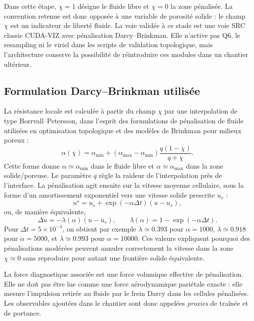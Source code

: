 \documentclass[11pt,a4paper]{article}
\begin{document}
Dans cette étape, $\chi=1$ désigne le fluide libre et $\chi=0$ la zone pénalisée. La convention retenue est donc opposée à une variable de porosité solide : le champ $\chi$ est un indicateur de liberté fluide. La voie validée à ce stade est une voie SRC classic CUDA-VIZ avec pénalisation Darcy--Brinkman. Elle n'active pas Q6, le resampling ni le viriel dans les scripts de validation topologique, mais l'architecture conserve la possibilité de réintroduire ces modules dans un chantier ultérieur.

\subsection{Formulation Darcy--Brinkman utilisée}

La résistance locale est calculée à partir du champ $\chi$ par une interpolation de type Borrvall--Petersson, dans l'esprit des formulations de pénalisation de fluide utilisées en optimisation topologique et des modèles de Brinkman pour milieux poreux \cite{Brinkman1949,BorrvallPetersson2003} :
\begin{equation}
  \alpha(\chi)=\alpha_{\min}+\left(\alpha_{\max}-\alpha_{\min}\right)\frac{q(1-\chi)}{q+\chi}.
\end{equation}
Cette forme donne $\alpha\simeq \alpha_{\min}$ dans le fluide libre et $\alpha\simeq \alpha_{\max}$ dans la zone solide/poreuse. Le paramètre $q$ règle la raideur de l'interpolation près de l'interface. La pénalisation agit ensuite sur la vitesse moyenne cellulaire, sous la forme d'un amortissement exponentiel vers une vitesse solide prescrite $u_s$ :
\begin{equation}
  u^{\star}=u_s+\exp(-\alpha\Delta t)(u-u_s),
\end{equation}
ou, de manière équivalente,
\begin{equation}
  \Delta u=-\lambda(\alpha)(u-u_s),\qquad
  \lambda(\alpha)=1-\exp(-\alpha\Delta t).
\end{equation}
Pour $\Delta t=5\times10^{-4}$, on obtient par exemple $\lambda\simeq0.393$ pour $\alpha=1000$, $\lambda\simeq0.918$ pour $\alpha=5000$, et $\lambda\simeq0.993$ pour $\alpha=10000$. Ces valeurs expliquent pourquoi des pénalisations modérées peuvent annuler correctement la vitesse dans la zone $\chi\simeq0$ sans reproduire pour autant une frontière solide équivalente.

La force diagnostique associée est une force volumique effective de pénalisation. Elle ne doit pas être lue comme une force aérodynamique pariétale exacte : elle mesure l'impulsion retirée au fluide par le frein Darcy dans les cellules pénalisées. Les observables ajoutées dans le chantier sont donc appelées \emph{proxies} de traînée et de portance.
\end{document}
